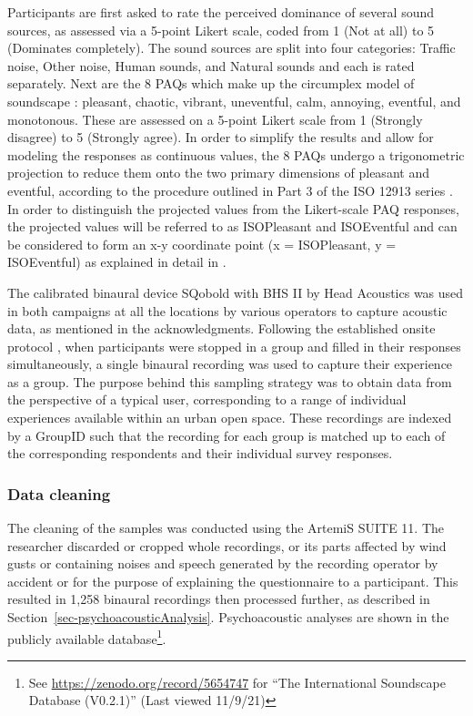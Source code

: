 \documentclass[
  authoryear,
  preprint,
  3p,
  onecolumn]{elsarticle}
\begin{document}
Participants are first asked to rate the perceived dominance of several
sound sources, as assessed via a 5-point Likert scale, coded from 1 (Not
at all) to 5 (Dominates completely). The sound sources are split into
four categories: Traffic noise, Other noise, Human sounds, and Natural
sounds and each is rated separately. Next are the 8 PAQs which make up
the circumplex model of soundscape \citep{Axelsson2010principal}:
pleasant, chaotic, vibrant, uneventful, calm, annoying, eventful, and
monotonous. These are assessed on a 5-point Likert scale from 1
(Strongly disagree) to 5 (Strongly agree). In order to simplify the
results and allow for modeling the responses as continuous values, the 8
PAQs undergo a trigonometric projection to reduce them onto the two
primary dimensions of pleasant and eventful, according to the procedure
outlined in Part 3 of the ISO 12913 series \citep{ISO12913Part3}. In
order to distinguish the projected values from the Likert-scale PAQ
responses, the projected values will be referred to as ISOPleasant and
ISOEventful and can be considered to form an x-y coordinate point (x =
ISOPleasant, y = ISOEventful) as explained in detail in
\citet{Lionello2021Introducing}.

The calibrated binaural device SQobold with BHS II by Head Acoustics was
used in both campaigns at all the locations by various operators to
capture acoustic data, as mentioned in the acknowledgments. Following
the established onsite protocol \citep{Mitchell2020Soundscape}, when
participants were stopped in a group and filled in their responses
simultaneously, a single binaural recording was used to capture their
experience as a group. The purpose behind this sampling strategy was to
obtain data from the perspective of a typical user, corresponding to a
range of individual experiences available within an urban open space.
These recordings are indexed by a GroupID such that the recording for
each group is matched up to each of the corresponding respondents and
their individual survey responses.

\hypertarget{data-cleaning}{%
\subsubsection{Data cleaning}\label{data-cleaning}}

The cleaning of the samples was conducted using the ArtemiS SUITE 11.
The researcher discarded or cropped whole recordings, or its parts
affected by wind gusts or containing noises and speech generated by the
recording operator by accident or for the purpose of explaining the
questionnaire to a participant. This resulted in 1,258 binaural
recordings then processed further, as described in
Section~\ref{sec-psychoacousticAnalysis}. Psychoacoustic analyses are
shown in the publicly available database\footnote{See
  \url{https://zenodo.org/record/5654747} for ``The International
  Soundscape Database (V0.2.1)'' (Last viewed 11/9/21)}.
\end{document}
